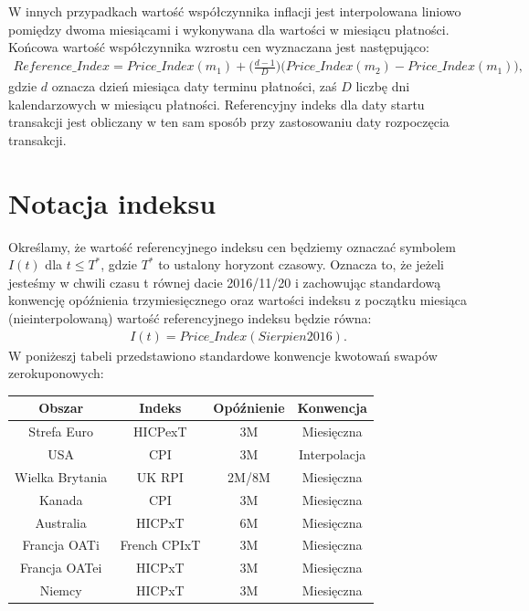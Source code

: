 \documentclass{mini}
\theoremstyle{mythstyle}
\begin{document}
	W innych przypadkach wartość współczynnika inflacji jest interpolowana liniowo pomiędzy dwoma miesiącami i wykonywana dla wartości w miesiącu płatności. Końcowa wartość współczynnika wzrostu cen wyznaczana jest następująco:
	\begin{eqnarray*}
		Reference\_Index = Price\_Index(m_1) + \bigg(\frac{d - 1}{D}\bigg) \bigg(Price\_Index(m_2) - Price\_Index(m_1)\bigg),
	\end{eqnarray*}
	gdzie $d$ oznacza dzień miesiąca daty terminu płatności, zaś $D$  liczbę dni kalendarzowych w miesiącu płatności. Referencyjny indeks dla daty startu transakcji jest obliczany w ten sam sposób przy zastosowaniu daty rozpoczęcia transakcji.
	
	\section{Notacja indeksu}
	
	Określamy, że wartość referencyjnego indeksu cen będziemy oznaczać symbolem $I(t)$ dla $t \le T^*$, gdzie $T^*$ to ustalony horyzont czasowy. Oznacza to, że jeżeli jesteśmy w chwili czasu t równej dacie 2016/11/20 i zachowując standardową konwencję opóźnienia trzymiesięcznego oraz wartości indeksu z początku miesiąca (nieinterpolowaną) wartość referencyjnego indeksu będzie równa:
	\begin{eqnarray*}
		I(t) = Price\_Index(Sierpien2016).
	\end{eqnarray*}
	W poniżeszj tabeli przedstawiono standardowe konwencje kwotowań swapów zerokuponowych:
	\begin{center}
		\begin{tabular}{c c c c}
			\textbf{Obszar} & \textbf{Indeks}  & \textbf{Opóźnienie} & \textbf{Konwencja}\\ \hline
			Strefa Euro & HICPexT & 3M & Miesięczna \\
			USA & CPI & 3M & Interpolacja \\
			Wielka Brytania & UK RPI & 2M/8M & Miesięczna \\
			Kanada & CPI & 3M & Miesięczna \\
			Australia & HICPxT & 6M & Miesięczna \\
			Francja OATi & French CPIxT & 3M & Miesięczna \\
			Francja OATei& HICPxT & 3M & Miesięczna \\
			Niemcy & HICPxT & 3M & Miesięczna
		\end{tabular}
	\end{center}
\end{document}
